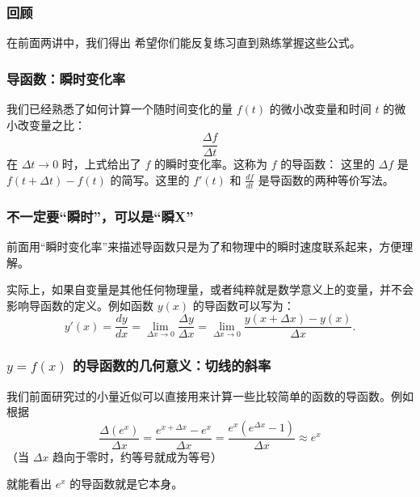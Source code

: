 \documentclass[CJK,13pt]{beamer}
\date{}
\begin{document}
  \bch

  
\begin{frame}
  \frametitle{回顾}
  在前面两讲中，我们得出  
  希望你们能反复练习直到熟练掌握这些公式。
\end{frame}


\begin{frame}
  \frametitle{导函数：瞬时变化率}
  我们已经熟悉了如何计算一个随时间变化的量 $f(t)$ 的微小改变量和时间 $t$ 的微小改变量之比：
  $$\frac{\Delta f}{\Delta t}$$
  在 $\Delta t\rightarrow 0$ 时，上式给出了 $f$ 的瞬时变化率。这称为 $f$ 的{\blue 导函数}：
这里的 $\Delta f$ 是 $ f(t+\Delta t) - f(t)$ 的简写。这里的 $f'(t)$ 和 $\frac{df}{dt}$ 是导函数的两种等价写法。

\end{frame}

\begin{frame}
  \frametitle{不一定要“瞬时”，可以是“瞬X”}
  前面用“瞬时变化率”来描述导函数只是为了和物理中的瞬时速度联系起来，方便理解。

  \skipline
  
  实际上，如果自变量是其他任何物理量，或者纯粹就是数学意义上的变量，并不会影响导函数的定义。例如函数 $y(x)$ 的导函数可以写为：
  $$y'(x) = \frac{dy}{dx} = \lim_{\Delta x\rightarrow 0}\frac{\Delta y}{\Delta x}=\lim_{\Delta x\rightarrow 0}\frac{y(x+\Delta x)-y(x)}{\Delta x}.$$
\end{frame}

\begin{frame}
  \frametitle{$y=f(x)$ 的导函数的几何意义：切线的斜率}


\end{frame}



\begin{frame}
  我们前面研究过的小量近似可以直接用来计算一些比较简单的函数的导函数。例如根据
  $$\frac{\Delta (e^x)}{\Delta x} = \frac{e^{x+\Delta x}-e^x}{\Delta x} = \frac{e^x(e^{\Delta x}-1)}{\Delta x} \approx e^x $$
  （当 $\Delta x$ 趋向于零时，约等号就成为等号）
  
  就能看出 $e^x$ 的导函数就是它本身。
\end{frame}
\end{document}
